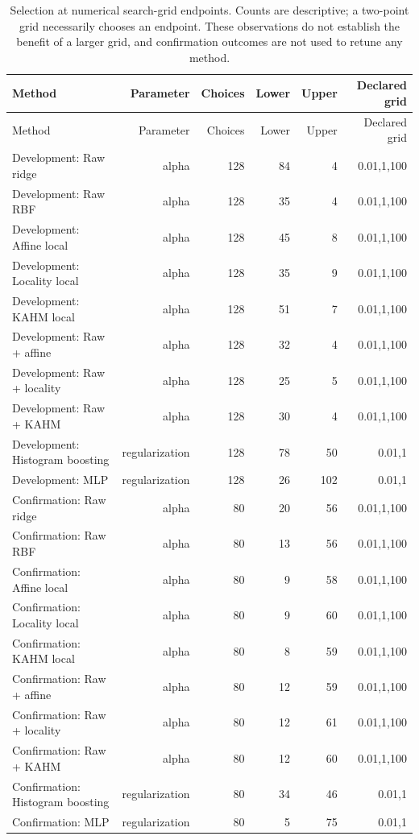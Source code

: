 {\small\setlength{\tabcolsep}{4pt}
\begin{longtable}{lrrrrr}
\caption{Selection at numerical search-grid endpoints. Counts are descriptive; a two-point grid necessarily chooses an endpoint. These observations do not establish the benefit of a larger grid, and confirmation outcomes are not used to retune any method.}\label{tab:grid-boundaries}\\
\toprule
Method & Parameter & Choices & Lower & Upper & Declared grid \\
\midrule
\endfirsthead
\toprule
Method & Parameter & Choices & Lower & Upper & Declared grid \\
\midrule
\endhead
Development: Raw ridge & alpha & 128 & 84 & 4 & 0.01,1,100 \\
Development: Raw RBF & alpha & 128 & 35 & 4 & 0.01,1,100 \\
Development: Affine local & alpha & 128 & 45 & 8 & 0.01,1,100 \\
Development: Locality local & alpha & 128 & 35 & 9 & 0.01,1,100 \\
Development: KAHM local & alpha & 128 & 51 & 7 & 0.01,1,100 \\
Development: Raw + affine & alpha & 128 & 32 & 4 & 0.01,1,100 \\
Development: Raw + locality & alpha & 128 & 25 & 5 & 0.01,1,100 \\
Development: Raw + KAHM & alpha & 128 & 30 & 4 & 0.01,1,100 \\
Development: Histogram boosting & regularization & 128 & 78 & 50 & 0.01,1 \\
Development: MLP & regularization & 128 & 26 & 102 & 0.01,1 \\
Confirmation: Raw ridge & alpha & 80 & 20 & 56 & 0.01,1,100 \\
Confirmation: Raw RBF & alpha & 80 & 13 & 56 & 0.01,1,100 \\
Confirmation: Affine local & alpha & 80 & 9 & 58 & 0.01,1,100 \\
Confirmation: Locality local & alpha & 80 & 9 & 60 & 0.01,1,100 \\
Confirmation: KAHM local & alpha & 80 & 8 & 59 & 0.01,1,100 \\
Confirmation: Raw + affine & alpha & 80 & 12 & 59 & 0.01,1,100 \\
Confirmation: Raw + locality & alpha & 80 & 12 & 61 & 0.01,1,100 \\
Confirmation: Raw + KAHM & alpha & 80 & 12 & 60 & 0.01,1,100 \\
Confirmation: Histogram boosting & regularization & 80 & 34 & 46 & 0.01,1 \\
Confirmation: MLP & regularization & 80 & 5 & 75 & 0.01,1 \\
\bottomrule
\end{longtable}
}
